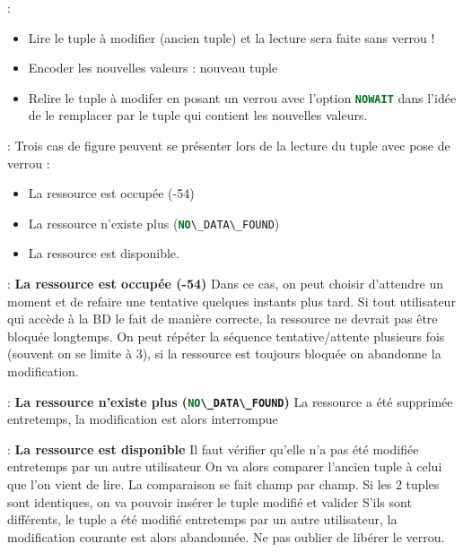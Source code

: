 \documentclass[10pt]{beamer}
\begin{document}
\begin{frame}{\secname : \subsecname}
    \begin{itemize}
        \item  Lire le tuple à modifier (ancien tuple) et la lecture sera faite sans verrou !
        \item Encoder les nouvelles valeurs : nouveau tuple
        \item Relire le tuple à modifer en posant un verrou avec l'option \lstinline[language=sql]!NOWAIT! dans l'idée de le remplacer par le tuple qui contient les nouvelles valeurs.
    \end{itemize}
\end{frame}

\begin{frame}{\secname : \subsecname}
    Trois cas de figure peuvent se présenter lors de la lecture du tuple avec pose de verrou :
    \begin{itemize}
        \item La ressource est occupée (-54)
        \item La ressource n'existe plus (\lstinline[language=sql]!NO\_DATA\_FOUND!)
        \item La ressource est disponible.
    \end{itemize}
\end{frame}

\begin{frame}{\secname : \subsecname}
    \textbf{La ressource est occupée (-54)}
    Dans ce cas, on peut choisir d'attendre un moment et de refaire une tentative quelques instants plus tard.
    Si tout utilisateur qui accède à la BD le fait de manière correcte, la ressource ne devrait pas être bloquée longtemps.
    On peut répéter la séquence tentative/attente plusieurs fois (souvent on se limite à 3), si la ressource est toujours bloquée on abandonne la modification.
\end{frame}

\begin{frame}{\secname : \subsecname}
    \textbf{La ressource n'existe plus (\lstinline[language=sql]!NO\_DATA\_FOUND!)}
    La ressource a été supprimée entretemps, la modification est alors interrompue
\end{frame}
\begin{frame}{\secname : \subsecname}
    \textbf{La ressource est disponible}
    Il faut vérifier qu'elle n'a pas été modifiée entretemps par un autre utilisateur
    On va alors comparer l'ancien tuple à celui que l'on vient de lire.  La comparaison se fait champ par champ.
    Si les 2 tuples sont identiques, on va pouvoir insérer le tuple modifié et valider
    S'ils sont différents, le tuple a été modifié entretemps par un autre utilisateur, la modification courante est alors abandonnée.  Ne pas oublier de libérer le verrou.
\end{frame}
\end{document}
